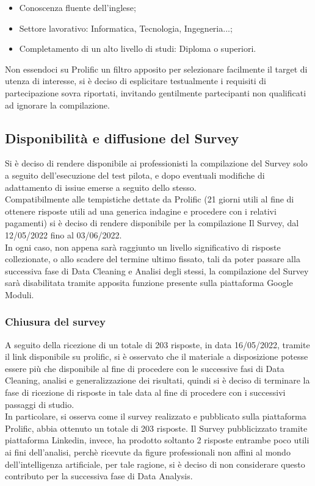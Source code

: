     \begin{itemize}
        \item Conoscenza fluente dell'inglese;
        \item Settore lavorativo: Informatica, Tecnologia, Ingegneria...;
        \item Completamento di un alto livello di studi: Diploma o superiori.
    \end{itemize}
    
    Non essendoci su Prolific un filtro apposito per selezionare facilmente il target di utenza di interesse, si è deciso di esplicitare testualmente i requisiti di partecipazione sovra riportati, invitando gentilmente partecipanti non qualificati ad ignorare la compilazione. 
    
    
    \subsection{Disponibilità e diffusione del Survey}
    Si è deciso di rendere disponibile ai professionisti la compilazione del Survey solo a seguito dell'esecuzione del test pilota, e dopo eventuali modifiche di adattamento di issiue emerse a seguito dello stesso.\\ Compatibilmente alle tempistiche dettate da Prolific (21 giorni utili al fine di ottenere risposte utili ad una generica indagine e procedere con i relativi pagamenti) si è deciso di rendere disponibile per la compilazione Il Survey, dal 12/05/2022 fino al 03/06/2022.\\
    
    In ogni caso, non appena sarà raggiunto un livello significativo di risposte collezionate, o allo scadere del termine ultimo fissato, tali da poter passare alla successiva fase di Data Cleaning e Analisi degli stessi, la compilazione del Survey sarà disabilitata tramite apposita funzione presente sulla piattaforma Google Moduli.
    
    \subsubsection{Chiusura del survey}
    A seguito della ricezione di un totale di 203 risposte, in data 16/05/2022, tramite il link disponibile su prolific, si è osservato che il materiale a disposizione potesse essere più che disponibile al fine di procedere con le successive fasi di Data Cleaning, analisi e generalizzazione dei risultati, quindi si è deciso di terminare la fase di ricezione di risposte in tale data al fine di procedere con i successivi passaggi di studio.\\
    In particolare, si osserva come il survey realizzato e pubblicato sulla piattaforma Prolific, abbia ottenuto un totale di 203 risposte. Il Survey pubblicizzato tramite piattaforma Linkedin, invece, ha prodotto soltanto 2 risposte entrambe poco utili ai fini dell'analisi, perchè ricevute da figure professionali non affini al mondo dell'intelligenza artificiale, per tale ragione, si è deciso di non considerare questo contributo per la successiva fase di Data Analysis.
    
